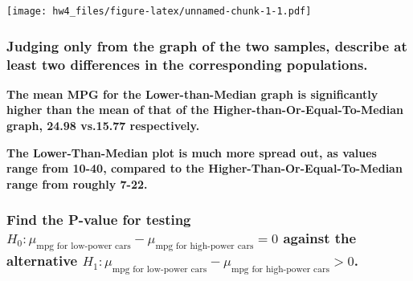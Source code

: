 \documentclass[]{article}
\newenvironment{Shaded}{\begin{snugshade}}{\end{snugshade}}
\newcommand{\KeywordTok}[1]{\textcolor[rgb]{0.13,0.29,0.53}{\textbf{#1}}}
\newcommand{\DataTypeTok}[1]{\textcolor[rgb]{0.13,0.29,0.53}{#1}}
\newcommand{\DecValTok}[1]{\textcolor[rgb]{0.00,0.00,0.81}{#1}}
\newcommand{\StringTok}[1]{\textcolor[rgb]{0.31,0.60,0.02}{#1}}
\newcommand{\OperatorTok}[1]{\textcolor[rgb]{0.81,0.36,0.00}{\textbf{#1}}}
\newcommand{\NormalTok}[1]{#1}
\begin{document}
\begin{Shaded}
\end{Shaded}

\texttt{[image: hw4\_files/figure-latex/unnamed-chunk-1-1.pdf]}

\subsubsection{Judging only from the graph of the two samples, describe
at least two differences in the corresponding
populations.}\label{judging-only-from-the-graph-of-the-two-samples-describe-at-least-two-differences-in-the-corresponding-populations.}

\textbf{The mean MPG for the Lower-than-Median graph is significantly
higher than the mean of that of the Higher-than-Or-Equal-To-Median
graph, 24.98 vs.15.77 respectively. }

\textbf{The Lower-Than-Median plot is much more spread out, as values
range from 10-40, compared to the Higher-Than-Or-Equal-To-Median range
from roughly 7-22.}

\subsubsection{\texorpdfstring{Find the P-value for testing
\(H_0: \mu_{\text{mpg for low-power cars}} - \mu_{\text{mpg for high-power cars}} = 0\)
against the alternative
\(H_1: \mu_{\text{mpg for low-power cars}} - \mu_{\text{mpg for high-power cars}} > 0\).}{Find the P-value for testing H\_0: \textbackslash{}mu\_\{\textbackslash{}text\{mpg for low-power cars\}\} - \textbackslash{}mu\_\{\textbackslash{}text\{mpg for high-power cars\}\} = 0 against the alternative H\_1: \textbackslash{}mu\_\{\textbackslash{}text\{mpg for low-power cars\}\} - \textbackslash{}mu\_\{\textbackslash{}text\{mpg for high-power cars\}\} \textgreater{} 0.}}\label{find-the-p-value-for-testing-h_0-mu_textmpg-for-low-power-cars---mu_textmpg-for-high-power-cars-0-against-the-alternative-h_1-mu_textmpg-for-low-power-cars---mu_textmpg-for-high-power-cars-0.}
\end{document}
